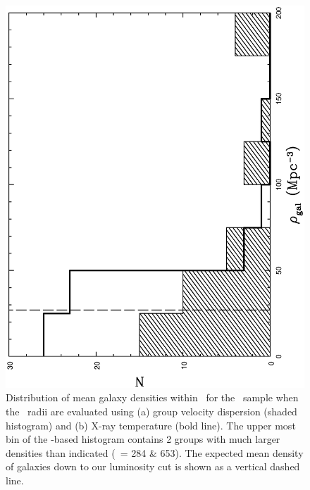 \documentclass[usenatbib]{mn2e}
\begin{document}
\begin{figure}

  \includegraphics[height=\linewidth,angle=270]{fig_10.ps}
  \caption{Distribution of mean galaxy densities within \rfh\ for the \GEMS\ sample
           when the \rfh\ radii are evaluated using (a) group velocity dispersion
           (shaded histogram) and (b) X-ray temperature (bold line).  The upper
           most bin of the \sigmav-based histogram contains 2 groups with much
           larger densities than indicated (\dengal\ = 284 \& 653).  The expected
           mean density of galaxies down to our luminosity cut is shown as a
           vertical dashed line.}
  \label{fig_dengal_hist}

\end{figure}
\end{document}

